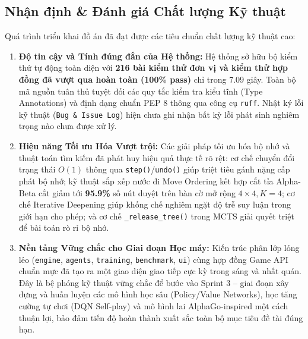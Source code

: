 \documentclass[a4paper,12pt]{report}
\begin{document}
\subsection{Nhận định \& Đánh giá Chất lượng Kỹ thuật}
Quá trình triển khai đồ án đã đạt được các tiêu chuẩn chất lượng kỹ thuật cao:
\begin{enumerate}[leftmargin=1.5cm]
    \item \textbf{Độ tin cậy và Tính đúng đắn của Hệ thống:}
    Hệ thống sở hữu bộ kiểm thử tự động toàn diện với \textbf{216 bài kiểm thử đơn vị và kiểm thử hợp đồng đã vượt qua hoàn toàn (100\% pass)} chỉ trong $7.09$ giây. Toàn bộ mã nguồn tuân thủ tuyệt đối các quy tắc kiểm tra kiểu tĩnh (Type Annotations) và định dạng chuẩn PEP 8 thông qua công cụ \texttt{ruff}. Nhật ký lỗi kỹ thuật (\texttt{Bug \& Issue Log}) hiện chưa ghi nhận bất kỳ lỗi phát sinh nghiêm trọng nào chưa được xử lý.
    \item \textbf{Hiệu năng Tối ưu Hóa Vượt trội:}
    Các giải pháp tối ưu hóa bộ nhớ và thuật toán tìm kiếm đã phát huy hiệu quả thực tế rõ rệt: cơ chế chuyển đổi trạng thái $O(1)$ thông qua \texttt{step()}/\texttt{undo()} giúp triệt tiêu gánh nặng cấp phát bộ nhớ; kỹ thuật sắp xếp nước đi Move Ordering kết hợp cắt tỉa Alpha-Beta cắt giảm tới \textbf{95.9\%} số nút duyệt trên bàn cờ mở rộng $4 \times 4, K=4$; cơ chế Iterative Deepening giúp khống chế nghiêm ngặt độ trễ suy luận trong giới hạn cho phép; và cơ chế \texttt{\_release\_tree()} trong MCTS giải quyết triệt để bài toán rò rỉ bộ nhớ.
    \item \textbf{Nền tảng Vững chắc cho Giai đoạn Học máy:}
    Kiến trúc phân lớp lỏng lẻo (\texttt{engine}, \texttt{agents}, \texttt{training}, \texttt{benchmark}, \texttt{ui}) cùng hợp đồng Game API chuẩn mực đã tạo ra một giao diện giao tiếp cực kỳ trong sáng và nhất quán. Đây là bệ phóng kỹ thuật vững chắc để bước vào Sprint 3 -- giai đoạn xây dựng và huấn luyện các mô hình học sâu (Policy/Value Networks), học tăng cường tự chơi (DQN Self-play) và mô hình lai AlphaGo-inspired một cách thuận lợi, bảo đảm tiến độ hoàn thành xuất sắc toàn bộ mục tiêu đề tài đúng hạn.
\end{enumerate}
\end{document}
